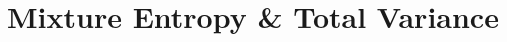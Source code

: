\documentclass[../main.tex]{subfiles}
\begin{document}








\newpage
\section{Mixture Entropy \& Total Variance}
\end{document}

